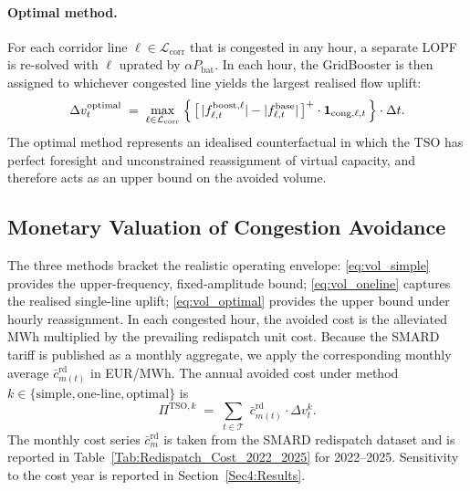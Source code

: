 \paragraph{Optimal method.} For each corridor line $\ell \in \mathcal{L}_{\mathrm{corr}}$ that is congested in any hour, a separate LOPF is re-solved with $\ell$ uprated by $\alpha P_{\mathrm{bat}}$. In each hour, the GridBooster is then assigned to whichever congested line yields the largest realised flow uplift:
\begin{equation}
    \Delta v^{\mathrm{optimal}}_t
    \;=\; \max_{\ell \in \mathcal{L}_{\mathrm{corr}}}\;
        \Bigl\{\,\bigl[\,|f^{\mathrm{boost},\ell}_{\ell,t}| - |f^{\mathrm{base}}_{\ell,t}|\,\bigr]^{+} \cdot \mathbf{1}_{\mathrm{cong},\ell,t}\,\Bigr\} \cdot \Delta t.
    \label{eq:vol_optimal}
\end{equation}
The optimal method represents an idealised counterfactual in which the TSO has perfect foresight and unconstrained reassignment of virtual capacity, and therefore acts as an upper bound on the avoided volume. 

\subsection{Monetary Valuation of Congestion Avoidance}\label{Subsubsec3:Monetary_valuation}

The three methods bracket the realistic operating envelope: \eqref{eq:vol_simple} provides the upper-frequency, fixed-amplitude bound; \eqref{eq:vol_oneline} captures the realised single-line uplift; \eqref{eq:vol_optimal} provides the upper bound under hourly reassignment.
In each congested hour, the avoided cost is the alleviated MWh multiplied by the prevailing redispatch unit cost. Because the SMARD tariff is published as a monthly aggregate, we apply the corresponding monthly average $\bar{c}^{\mathrm{rd}}_{m(t)}$ in EUR/MWh. The annual avoided cost under method $k \in \{\mathrm{simple, one\text{-}line, optimal}\}$ is
\begin{equation}
    \Pi^{\mathrm{TSO},k}
    \;=\; \sum_{t \in \mathcal{T}} \;\bar{c}^{\mathrm{rd}}_{m(t)} \cdot \Delta v^{k}_t.
    \label{eq:tso_revenue}
\end{equation}
The monthly cost series $\bar{c}^{\mathrm{rd}}_{m}$ is taken from the SMARD redispatch dataset and is reported in Table~\ref{Tab:Redispatch_Cost_2022_2025} for 2022--2025. Sensitivity to the cost year is reported in Section~\ref{Sec4:Results}.
 

